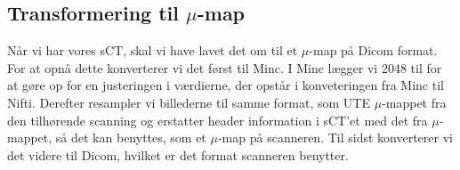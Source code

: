 \subsection{Transformering til \texorpdfstring{$\mu$}{u}-map} 

Når vi har vores sCT, skal vi have lavet det om til et $\mu$-map
på Dicom format. For at opnå dette konverterer vi det først til
Minc. I Minc lægger vi 2048 til for at gøre op for en justeringen i
værdierne, der opstår i konveteringen fra Minc til Nifti. Derefter
resampler vi billederne til samme format, som UTE $\mu$-mappet fra den
tilhørende scanning og erstatter header information i sCT'et med det fra
$\mu$-mappet, så det kan benyttes, som et $\mu$-map på scanneren. Til
sidst konverterer vi det videre til Dicom, hvilket er det format scanneren
benytter.








